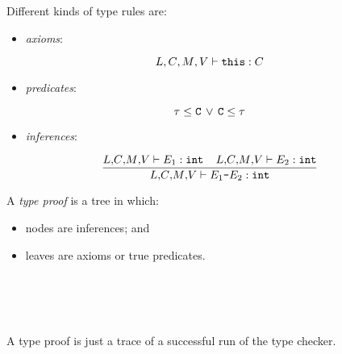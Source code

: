 \begin{slide*}
Different kinds of type rules are:
\begin{itemize}
\item {\em axioms}:
\end{itemize}
      $$\mbox{$L$}{},\mbox{$C$}{},\mbox{$M$}{},\mbox{$V$}{} \vdash \mbox{\tt this}: \mbox{$C$}{}$$
\begin{itemize}
\item {\em predicates}:
\end{itemize}
      $$\tau\leq\mbox{\tt C} \,\vee\, \mbox{\tt C}\leq\tau$$
\begin{itemize}
\item {\em inferences}:\\
\end{itemize}
      $$ \frac{\lib{},\!\class{},\!\method{},\!\vars{} \vdash E_1: \mbox{\tt int}\;\;\;\;
         \lib{},\!\class{},\!\method{},\!\vars{} \vdash E_2: \mbox{\tt int}}{
         \lib{},\!\class{},\!\method{},\!\vars{} \vdash E_1 \mbox{\tt -} E_2: \mbox{\tt int}} $$
\vfil
\end{slide*}
 
\begin{slide*}
A {\em type proof\/} is a tree in which:
\begin{itemize}
\item nodes are inferences; and
\item leaves are axioms or true predicates.
\end{itemize}
~\\


~\\
~\\
A type proof is just a trace of a successful run of the type checker.
\vfil
\end{slide*}

\newcommand{\FRAC}[2]{\mkern-2mu\displaystyle\frac{\rule[-1.5ex]{0ex}{4ex}#1}{\vphantom{,}\rule[-1.5ex]{0ex}{4ex}#2}\mkern-2mu}
 
